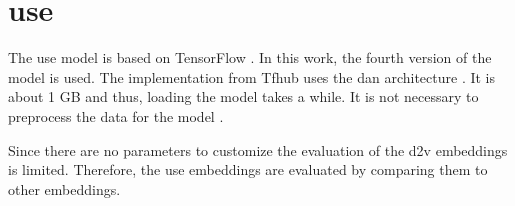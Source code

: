 \section{\ac{use}}\label{sec:impl-use}

The \ac{use} model is based on TensorFlow \cite{HfsentTrans2019}.
In this work, the fourth version of the model is used.
The implementation from Tfhub uses the \ac{dan} architecture \cite{UniversalSentEnc-dev}.
It is about 1 GB and thus, loading the model takes a while.
It is not necessary to preprocess the data for the model \cite{UniversalSentEnc-dev}.

Since there are no parameters to customize the evaluation of the \ac{d2v} embeddings is limited.
Therefore, the \ac{use} embeddings are evaluated by comparing them to other embeddings.